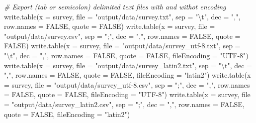 \documentclass[
]{book}
\newenvironment{Shaded}{\begin{snugshade}}{\end{snugshade}}
\newcommand{\AttributeTok}[1]{\textcolor[rgb]{0.77,0.63,0.00}{#1}}
\newcommand{\CommentTok}[1]{\textcolor[rgb]{0.56,0.35,0.01}{\textit{#1}}}
\newcommand{\ConstantTok}[1]{\textcolor[rgb]{0.00,0.00,0.00}{#1}}
\newcommand{\FunctionTok}[1]{\textcolor[rgb]{0.00,0.00,0.00}{#1}}
\newcommand{\NormalTok}[1]{#1}
\newcommand{\SpecialCharTok}[1]{\textcolor[rgb]{0.00,0.00,0.00}{#1}}
\newcommand{\StringTok}[1]{\textcolor[rgb]{0.31,0.60,0.02}{#1}}
\begin{document}
\begin{Shaded}
\begin{Highlighting}[]
\CommentTok{\# Export (tab or semicolon) delimited text files with and withot encoding}
\FunctionTok{write.table}\NormalTok{(}\AttributeTok{x =}\NormalTok{ survey, }\AttributeTok{file =} \StringTok{"output/data/survey.txt"}\NormalTok{, }\AttributeTok{sep =} \StringTok{"}\SpecialCharTok{\textbackslash{}t}\StringTok{"}\NormalTok{, }
            \AttributeTok{dec =} \StringTok{","}\NormalTok{, }\AttributeTok{row.names =} \ConstantTok{FALSE}\NormalTok{, }\AttributeTok{quote =} \ConstantTok{FALSE}\NormalTok{)}
\FunctionTok{write.table}\NormalTok{(}\AttributeTok{x =}\NormalTok{ survey, }\AttributeTok{file =} \StringTok{"output/data/survey.csv"}\NormalTok{, }\AttributeTok{sep =} \StringTok{";"}\NormalTok{, }
            \AttributeTok{dec =} \StringTok{","}\NormalTok{, }\AttributeTok{row.names =} \ConstantTok{FALSE}\NormalTok{, }\AttributeTok{quote =} \ConstantTok{FALSE}\NormalTok{)}
\FunctionTok{write.table}\NormalTok{(}\AttributeTok{x =}\NormalTok{ survey, }\AttributeTok{file =} \StringTok{"output/data/survey\_utf{-}8.txt"}\NormalTok{, }\AttributeTok{sep =} \StringTok{"}\SpecialCharTok{\textbackslash{}t}\StringTok{"}\NormalTok{, }
            \AttributeTok{dec =} \StringTok{","}\NormalTok{, }\AttributeTok{row.names =} \ConstantTok{FALSE}\NormalTok{, }\AttributeTok{quote =} \ConstantTok{FALSE}\NormalTok{, }\AttributeTok{fileEncoding =} \StringTok{"UTF{-}8"}\NormalTok{)}
\FunctionTok{write.table}\NormalTok{(}\AttributeTok{x =}\NormalTok{ survey, }\AttributeTok{file =} \StringTok{"output/data/survey\_latin2.txt"}\NormalTok{, }\AttributeTok{sep =} \StringTok{"}\SpecialCharTok{\textbackslash{}t}\StringTok{"}\NormalTok{, }
            \AttributeTok{dec =} \StringTok{","}\NormalTok{, }\AttributeTok{row.names =} \ConstantTok{FALSE}\NormalTok{, }\AttributeTok{quote =} \ConstantTok{FALSE}\NormalTok{, }\AttributeTok{fileEncoding =} \StringTok{"latin2"}\NormalTok{)}
\FunctionTok{write.table}\NormalTok{(}\AttributeTok{x =}\NormalTok{ survey, }\AttributeTok{file =} \StringTok{"output/data/survey\_utf{-}8.csv"}\NormalTok{, }\AttributeTok{sep =} \StringTok{";"}\NormalTok{, }
            \AttributeTok{dec =} \StringTok{","}\NormalTok{, }\AttributeTok{row.names =} \ConstantTok{FALSE}\NormalTok{, }\AttributeTok{quote =} \ConstantTok{FALSE}\NormalTok{, }\AttributeTok{fileEncoding =} \StringTok{"UTF{-}8"}\NormalTok{)}
\FunctionTok{write.table}\NormalTok{(}\AttributeTok{x =}\NormalTok{ survey, }\AttributeTok{file =} \StringTok{"output/data/survey\_latin2.csv"}\NormalTok{, }\AttributeTok{sep =} \StringTok{";"}\NormalTok{, }
            \AttributeTok{dec =} \StringTok{","}\NormalTok{, }\AttributeTok{row.names =} \ConstantTok{FALSE}\NormalTok{, }\AttributeTok{quote =} \ConstantTok{FALSE}\NormalTok{, }\AttributeTok{fileEncoding =} \StringTok{"latin2"}\NormalTok{)}


\end{Highlighting}
\end{Shaded}
\end{document}
